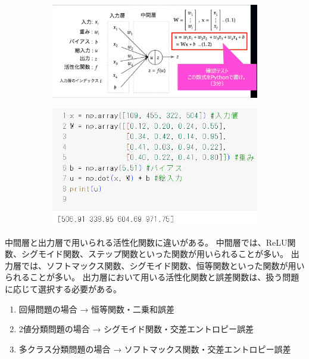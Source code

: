 \documentclass{ltjsarticle}
\begin{document}
\begin{figure}[ht]
  \centering
  \begin{subfigure}[b]{0.45\textwidth}
    \centering
    \includegraphics[width=\textwidth]{./capture/confirm_test/day1_02_3.png}
    \caption{}
    \label{fig:day1_02_3}
  \end{subfigure}
  \hfill
  \begin{subfigure}[b]{0.45\textwidth}
    \centering
    \includegraphics[width=\textwidth]{./capture/confirm_test/day1_02_4.png}
    \caption{}
    \label{fig:day1_02_4}
  \end{subfigure}
  \caption{}
\end{figure}

中間層と出力層で用いられる活性化関数に違いがある。
中間層では、ReLU関数、シグモイド関数、ステップ関数といった関数が用いられることが多い。
出力層では、ソフトマックス関数、シグモイド関数、恒等関数といった関数が用いられることが多い。
出力層において用いる活性化関数と誤差関数は、扱う問題に応じて選択する必要がある。
\begin{enumerate}
  \item 回帰問題の場合 → 恒等関数・二乗和誤差
  \item 2値分類問題の場合 → シグモイド関数・交差エントロピー誤差
  \item 多クラス分類問題の場合 → ソフトマックス関数・交差エントロピー誤差
\end{enumerate}
\end{document}
